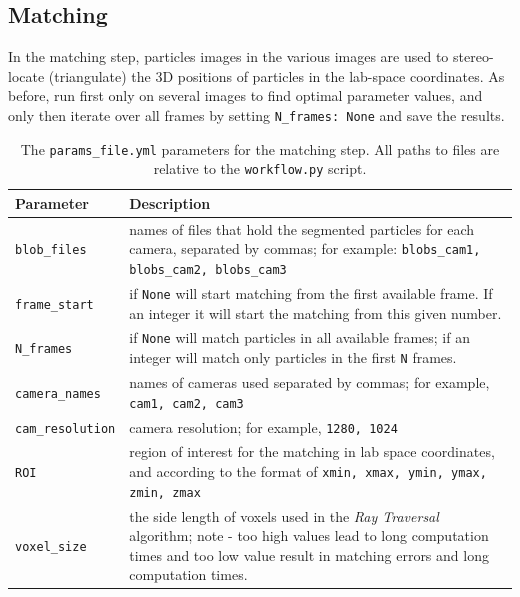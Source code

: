 \documentclass[10pt,a4paper]{article}
\begin{document}
\subsection{Matching}\label{sec:workflow_match}

In the matching step, particles images in the various images are used to stereo-locate (triangulate) the 3D positions of particles in the lab-space coordinates. As before, run first only on several images to find optimal parameter values, and only then iterate over all frames by setting \texttt{N\_frames: None} and save the results. 


\begin{table}[!ht]
	\centering
	\caption{The \texttt{params\_file.yml} parameters for the matching step. All paths to files are relative to the \texttt{workflow.py} script.}
	\begin{tabular}{l m{10cm}}
		\hline
		Parameter & Description\\
		\hline
		
		\texttt{blob\_files} & names of files that hold the segmented particles for each camera, separated by commas; for example: \texttt{blobs\_cam1, blobs\_cam2, blobs\_cam3} \\
		
		\texttt{frame\_start} & if \texttt{None} will start matching from the first available frame. If an integer it will start the matching from this given number. \\
		
		\texttt{N\_frames} & if \texttt{None} will match particles in all available frames; if an integer will match only particles in the first \texttt{N} frames. \\
		
		\texttt{camera\_names} & names of cameras used separated by commas; for example, \texttt{cam1, cam2, cam3} \\
		
		\texttt{cam\_resolution} & camera resolution; for example, \texttt{1280, 1024} \\
		
		\texttt{ROI} & region of interest for the matching in lab space coordinates, and according to the format of \texttt{xmin, xmax, ymin, ymax, zmin, zmax} \\
		
		\texttt{voxel\_size} & the side length of voxels used in the \textit{Ray Traversal} algorithm; note - too high values lead to long computation times and too low value result in matching errors and long computation times. \\
		

\end{tabular}
\end{table}
\end{document}

